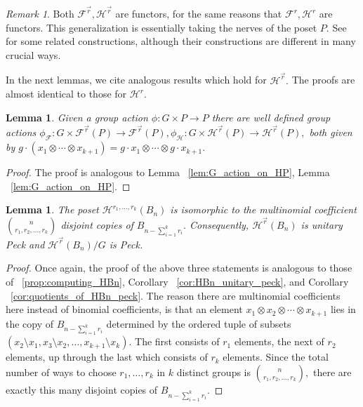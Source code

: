 \documentclass{amsart}
\newtheorem{lem}[thm]{Lemma}
\theoremstyle{remark}
\newtheorem{rem}[thm]{Remark}
\renewcommand{\vec}[1]{\overrightarrow{#1}}
\begin{document}
\begin{rem}
Both $\mathcal F^{\vec r},\mathcal H^{\vec r}$ are functors, for the same reasons that $\mathcal F^r, \mathcal H^r$ are functors. This generalization is essentially taking the nerves of the poset $P.$ See \cite{babson} for some related constructions, although their constructions are different in many crucial ways.
\end{rem}

In the next lemmas, we cite analogous results which hold for $\mathcal H^{\vec r}.$ The proofs are almost identical to those for $\mathcal H^r.$

\begin{lem}
Given a group action $\phi:G \times P \rightarrow P$ there are well defined group actions $\phi_{\mathcal F}:G\times \mathcal F^{\vec r}(P) \rightarrow \mathcal F^{\vec r}(P),\phi_{\mathcal H}:G\times \mathcal H^{\vec r}(P) \rightarrow \mathcal H^{\vec r}(P),$ 
both given by $g \cdot (x_1\otimes \cdots \otimes x_{k+1}) =g\cdot x_1 \otimes \cdots \otimes g \cdot x_{k+1}.$
\end{lem}
\begin{proof}
The proof is analogous to Lemma ~\ref{lem:G_action_on_HP}, Lemma ~\ref{lem:G_action_on_HP}.
\end{proof}

\begin{lem}
\label{lem:peck_quotients_vector_f}
The poset $\mathcal H^{r_1,\ldots, r_k}(B_n)$ is isomorphic to the multinomial coefficient $\binom n {r_1,r_2,\ldots, r_k}$ disjoint copies of $B_{n- \sum_{i=1}^k r_i}.$ Consequently, $\mathcal H^{\vec r}(B_n)$ is unitary Peck and $\mathcal H^{\vec r}(B_n)/G$ is Peck.
\end{lem}
\begin{proof}
Once again, the proof of the above three statements is analogous to those of ~\ref{prop:computing_HBn}, Corollary ~\ref{cor:HBn_unitary_peck}, and Corollary ~\ref{cor:quotients_of_HBn_peck}. The reason there are multinomial coefficients here instead of binomial coefficients, is that an element $x_1 \otimes x_2 \otimes \cdots \otimes x_{k+1}$ lies in the copy of $B_{n -\sum_{i=1}^k r_i}$ determined by the ordered tuple of subsets $(x_2 \setminus x_1,x_3 \setminus x_2, \ldots, x_{k+1} \setminus x_k).$ The first consists of $r_1$ elements, the next of $r_2$ elements, up through the last which consists of $r_k$ elements. Since the total number of ways to choose $r_1,\ldots, r_k$ in $k$ distinct groups is $\binom n {r_1,r_2,\ldots, r_k},$ there are exactly this many disjoint copies of $B_{n- \sum_{i=1}^k r_i}.$
\end{proof}
\end{document}
